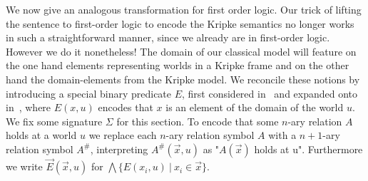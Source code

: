 \documentclass[runningheads]{llncs}
\begin{document}
We now give an analogous transformation for first order logic. Our trick of lifting the sentence to first-order logic to encode the Kripke semantics no longer works in such a straightforward manner, since we already are in first-order logic. However we do it nonetheless! The domain of our classical model will feature on the one hand elements representing worlds in a Kripke frame and on the other hand the domain-elements from the Kripke model. We reconcile these notions by introducing a special binary predicate $E$, first considered in~\cite{baaz2006skolemization} and expanded onto in~\cite{iemhoff2010eskolemization}, where $E(x, u)$ encodes that $x$ is an element of the domain of the world $u$. We fix some signature $\Sigma$ for this section. To encode that some $n$-ary relation $A$ holds at a world $u$ we replace each $n$-ary relation symbol $A$ with a $n+1$-ary relation symbol $A^\#$, interpreting $A^\#(\vec x, u)$ as "$A(\vec x)$ holds at u". Furthermore we write $\vec E(\vec x, u)$ for $\bigwedge\{E(x_i, u)\:|\:x_i\in \vec x\}$.
\end{document}
